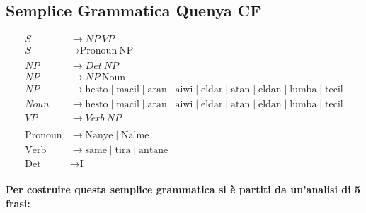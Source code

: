 \subsection{Semplice Grammatica Quenya CF}

\begin{tcolorbox}[title=Quenya,colback=gray!5!white,colframe=gray!75!black]
\begin{align*}
S &\rightarrow NP\ VP \\
S &\rightarrow \text{Pronoun}\ \text{NP} \\
\\
NP &\rightarrow Det\ NP \\
NP &\rightarrow NP\ \text{Noun} \\
NP &\rightarrow \text{hesto} \mid \text{macil} \mid \text{aran} \mid \text{aiwi} \mid \text{eldar} \mid \text{atan} \mid \text{eldan} \mid \text{lumba} \mid \text{tecil} \\
Noun &\rightarrow \text{hesto} \mid \text{macil} \mid \text{aran} \mid \text{aiwi} \mid \text{eldar} \mid \text{atan} \mid \text{eldan} \mid \text{lumba} \mid \text{tecil} \\
VP &\rightarrow Verb\ NP \\
\\
\text{Pronoun} &\rightarrow \text{Nanye} \mid \text{Nalme} \\
\text{Verb} &\rightarrow \text{same} \mid \text{tira} \mid \text{antane} \\
\text{Det} &\rightarrow \text{I}
\end{align*}
\end{tcolorbox}


\paragraph{Per costruire questa semplice grammatica si è partiti da un'analisi di 5 frasi:}

